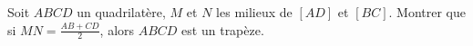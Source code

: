 Soit $ABCD$ un quadrilatère, $M$ et $N$ les milieux de $[AD]$ et $[BC]$. Montrer que si $MN = \frac{AB+CD}{2}$, alors $ABCD$ est un trapèze.
